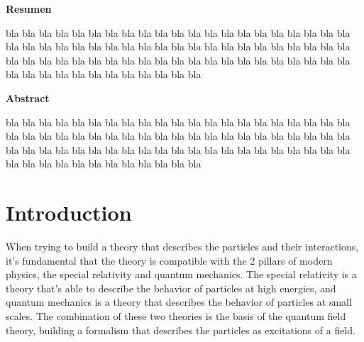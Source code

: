 \documentclass[11pt,a4paper,twoside,pdf]{article}
\numberwithin{equation}{section}
\begin{document}
\newpage
%
\begin{center}
{\bf Resumen}
\bigskip

\begin{minipage}{0.8\linewidth}
bla bla bla bla bla bla bla bla bla bla bla bla bla bla bla
bla bla bla bla bla bla bla bla bla bla bla bla bla bla bla
bla bla bla bla bla bla bla bla bla bla bla bla bla bla bla 
bla bla bla bla bla bla bla bla bla bla bla bla bla bla bla
bla bla bla bla bla bla bla bla bla bla bla bla bla bla bla
\end{minipage}

\newpage

{\bf Abstract} 
\bigskip

\begin{minipage}{0.8\linewidth}
bla bla bla bla bla bla bla bla bla bla bla bla bla bla bla
bla bla bla bla bla bla bla bla bla bla bla bla bla bla bla
bla bla bla bla bla bla bla bla bla bla bla bla bla bla bla 
bla bla bla bla bla bla bla bla bla bla bla bla bla bla bla
bla bla bla bla bla bla bla bla bla bla bla bla bla bla bla
\end{minipage}

\newpage

\end{center}


\tableofcontents


\pagestyle{fancy}
\fancyhead[RO,LE]{\leftmark}
\fancyhead[LO,RE]{\thepage}
\fancyfoot{}

\newpage

\section{Introduction}

When trying to build a theory that describes the particles and their interactions, 
it's fundamental that the theory is compatible with the 2 pillars of modern physics,
the special relativity and quantum mechanics. The special relativity is a theory 
that's able to describe the behavior of particles at high energies, and quantum 
mechanics is a theory that describes the behavior of particles at small scales.
The combination of these two theories is the basis of the quantum field theory,
building a formalism that describes the particles as excitations of a field.
\end{document}
